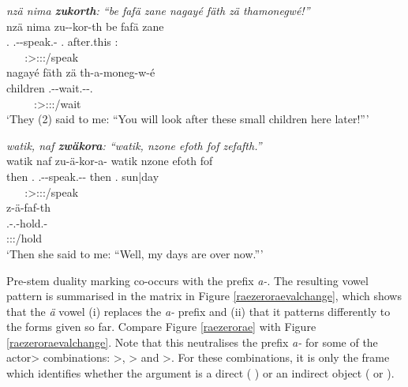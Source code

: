\begin{exe}
	\ex \emph{nzä nima \textbf{zukorth}: ``be fafä zane nagayé fäth zä thamonegwé!''}\\
	\glll nzä nima zu-\Zero-kor-th be fafä zane\\
	\Fsg.{\Abs} {\Quot} \Fsg.\Gam-\Du-speak.\Rs-\Stnsg{} \Ssg.{\Erg} after.this \Dem:{\Prox}\\
	~ ~ {\footnotesize \Stdu:\Sbj>\Fsg:\Obj:\Rpst:\Pfv/speak} ~ ~ ~\\
	\sn
	\glll nagayé fäth zä th-a-moneg-w-é\\
	children \Dim{} {\Prox} \Stnsg.\Bet-\Vc-wait.\Ext-\Ndu-\Ssg.{\Imp}\\
	~ ~ ~ {\footnotesize \Ssg:\Sbj>\Stpl:\Io:\Imp:\Ipfv/wait}\\
	\trans `They (2) said to me: ``You will look after these small children here later!'''\\ 
	\label{ex258}
\end{exe}
\begin{exe}
	\ex \emph{watik, naf \textbf{zwäkora}: ``watik, nzone efoth fof zefafth.''}\\
	\glll watik naf zu-ä-kor-a-\Zero{} watik nzone efoth fof\\
	then \Tsg.{\Erg} \Fsg.\Gam-\Ndu-speak.\Rs-\Pst-\Stsg{} then \Fsg.{\Poss} sun|day {\Emph}\\
	~ ~ {\footnotesize \Stsg:\Sbj>\Fsg:\Obj:\Pst:\Pfv/speak} ~ ~ ~ ~\\
	\sn
	\glll z-ä-faf-th\\
	\M.\Gam-\Ndu.\Vc-hold.\Rs-\Stnsg{}\\
	{\footnotesize \Stnsg:\Sbj:\Pst:\Pfv/hold}\\
	\trans `Then she said to me: ``Well, my days are over now.''' 
	\label{ex257}
\end{exe}

Pre-stem duality marking co-occurs with the  prefix \emph{a-}. The resulting vowel pattern is summarised in the matrix in Figure \ref{raezeroraevalchange}, which shows that the  \emph{ä} vowel (i) replaces the \emph{a-} prefix and (ii) that it patterns differently to the forms given so far. Compare Figure \ref{raezerorae} with Figure \ref{raezeroraevalchange}. Note that this neutralises the  prefix \emph{a-} for some of the actor> combinations: \Pl>{\Sg}, \Sg>{\Pl} and \Pl>{\Pl}. For these combinations, it is only the  frame which identifies whether the  argument is a direct  ({\Abs} ) or an indirect object ({\Dat} or {\Poss} ).

